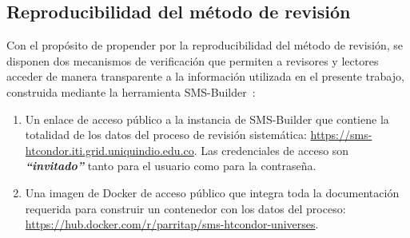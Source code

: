 
\subsection{Reproducibilidad del método de revisión}
\label{sec:reproducibilidad}

Con el propósito de propender por la reproducibilidad del método de revisión, se disponen dos mecanismos de verificación que permiten a revisores y lectores acceder de manera transparente a la información utilizada en el presente trabajo, construida mediante la herramienta SMS-Builder~\cite{sms-builder-repo}: \\

\begin{enumerate}[label=\Roman*)]
	\item Un enlace de acceso público a la instancia de SMS-Builder que contiene la totalidad de los datos del proceso de revisión sistemática: \url{https://sms-htcondor.iti.grid.uniquindio.edu.co}. Las credenciales de acceso son \hbox{\textbf{\textit{``invitado''}}} tanto para el usuario como para la contraseña.
	\item Una imagen de Docker de acceso público que integra toda la documentación requerida para construir un contenedor con los datos del proceso: \url{https://hub.docker.com/r/parritap/sms-htcondor-universes}.
\end{enumerate}





